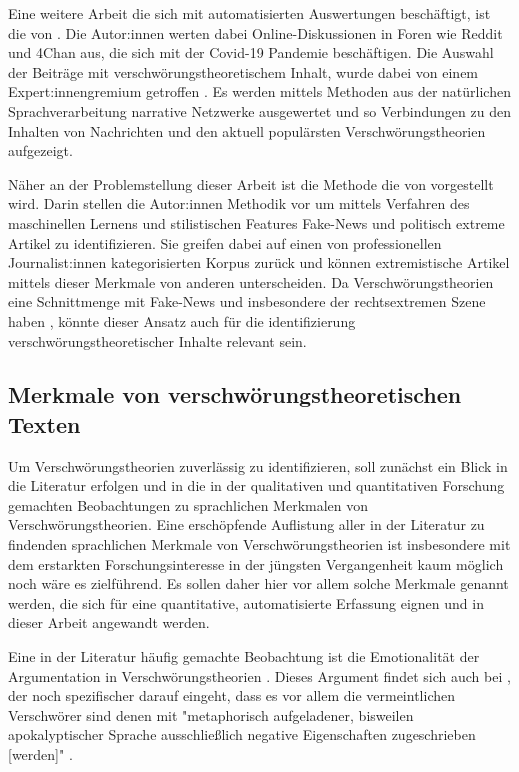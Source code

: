 Eine weitere Arbeit die sich mit automatisierten Auswertungen beschäftigt, ist die von \textcite{shahsavari_2020}.
Die Autor:innen werten dabei Online-Diskussionen in Foren wie Reddit und 4Chan aus, die sich mit der Covid-19 Pandemie beschäftigen.
Die Auswahl der Beiträge mit verschwörungstheoretischem Inhalt, wurde dabei von einem Expert:innengremium getroffen \parencite[284f]{shahsavari_2020}.
Es werden mittels Methoden aus der natürlichen Sprachverarbeitung narrative Netzwerke ausgewertet und so Verbindungen zu den Inhalten von Nachrichten und den aktuell populärsten Verschwörungstheorien aufgezeigt.

Näher an der Problemstellung dieser Arbeit ist die Methode die von \textcite{potthast_2018} vorgestellt wird.
Darin stellen die Autor:innen Methodik vor um mittels Verfahren des maschinellen Lernens und stilistischen Features Fake-News und politisch extreme Artikel zu identifizieren.
Sie greifen dabei auf einen von professionellen Journalist:innen kategorisierten Korpus zurück und können extremistische Artikel mittels dieser Merkmale von anderen unterscheiden.
Da Verschwörungstheorien eine Schnittmenge mit Fake-News und insbesondere der rechtsextremen Szene haben \parencite[vgl.][]{stumpf_2019}, könnte dieser Ansatz auch für die identifizierung verschwörungstheoretischer Inhalte relevant sein.

\subsection{Merkmale von verschwörungstheoretischen Texten}

Um Verschwörungstheorien zuverlässig zu identifizieren, soll zunächst ein Blick in die Literatur erfolgen und in die in der qualitativen und quantitativen Forschung gemachten Beobachtungen zu sprachlichen Merkmalen von Verschwörungstheorien.
Eine erschöpfende Auflistung aller in der Literatur zu findenden sprachlichen Merkmale von Verschwörungstheorien ist insbesondere mit dem erstarkten Forschungsinteresse in der jüngsten Vergangenheit kaum möglich noch wäre es zielführend.
Es sollen daher hier vor allem solche Merkmale genannt werden, die sich für eine quantitative, automatisierte Erfassung eignen und in dieser Arbeit angewandt werden.

Eine in der Literatur häufig gemachte Beobachtung ist die Emotionalität der Argumentation in Verschwörungstheorien \parencite[Vgl.][10]{miller_2002}.
Dieses Argument findet sich auch bei \textcite[][93ff]{butter_2018}, der noch spezifischer darauf eingeht, dass es vor allem die vermeintlichen Verschwörer sind denen mit "metaphorisch aufgeladener, bisweilen apokalyptischer Sprache ausschließlich negative Eigenschaften zugeschrieben [werden]" \parencite[][93f]{butter_2018}.

